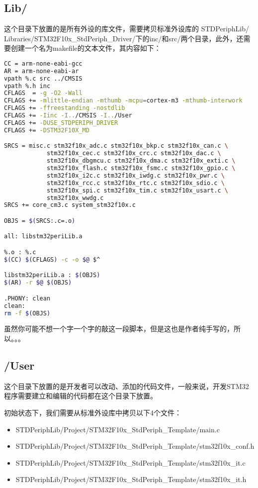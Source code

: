 \subsection{Lib/}
这个目录下放置的是所有外设的库文件，需要拷贝标准外设库的
STDPeriphLib/\\Libraries/STM32F10x\_StdPeriph\_Driver/下的inc/和src/两个目录，此外，还需要创建一个名为makefile的文本文件，其内容如下：
\begin{lstlisting}[language=bash, style=customStyleMakefile, caption=Lib/makefile]
CC = arm-none-eabi-gcc
AR = arm-none-eabi-ar 
vpath %.c src ../CMSIS
vpath %.h inc
CFLAGS  = -g -O2 -Wall
CFLAGS += -mlittle-endian -mthumb -mcpu=cortex-m3 -mthumb-interwork
CFLAGS += -ffreestanding -nostdlib
CFLAGS += -Iinc -I../CMSIS -I../User
CFLAGS += -DUSE_STDPERIPH_DRIVER
CFLAGS += -DSTM32F10X_MD

SRCS = misc.c stm32f10x_adc.c stm32f10x_bkp.c stm32f10x_can.c \
			stm32f10x_cec.c stm32f10x_crc.c stm32f10x_dac.c \
			stm32f10x_dbgmcu.c stm32f10x_dma.c stm32f10x_exti.c \
			stm32f10x_flash.c stm32f10x_fsmc.c stm32f10x_gpio.c \
			stm32f10x_i2c.c stm32f10x_iwdg.c stm32f10x_pwr.c \
			stm32f10x_rcc.c stm32f10x_rtc.c stm32f10x_sdio.c \
			stm32f10x_spi.c stm32f10x_tim.c stm32f10x_usart.c \
			stm32f10x_wwdg.c
SRCS += core_cm3.c system_stm32f10x.c

OBJS = $(SRCS:.c=.o)

all: libstm32periLib.a

%.o : %.c
$(CC) $(CFLAGS) -c -o $@ $^

libstm32periLib.a : $(OBJS)
$(AR) -r $@ $(OBJS)

.PHONY: clean 
clean: 
rm -f $(OBJS)
\end{lstlisting}
虽然你可能不想一个字一个字的敲这一段脚本，但是这也是作者纯手写的，所以。。。

\subsection{/User}
这个目录下放置的是开发者可以改动、添加的代码文件，一般来说，开发STM32程序需要建立和编辑的代码都在这个目录下放置。
\par 
初始状态下，我们需要从标准外设库中拷贝以下4个文件：
\begin{itemize}
	\item STDPeriphLib/Project/STM32F10x\_StdPeriph\_Template/main.c
	\item STDPeriphLib/Project/STM32F10x\_StdPeriph\_Template/stm32f10x\_conf.h
	\item STDPeriphLib/Project/STM32F10x\_StdPeriph\_Template/stm32f10x\_it.c
	\item STDPeriphLib/Project/STM32F10x\_StdPeriph\_Template/stm32f10x\_it.h
\end{itemize}

